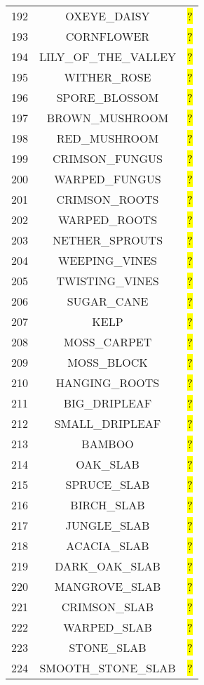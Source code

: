 \documentclass[11pt]{article}
\newcommand\myworries[1]{\sethlcolor{red}\hl{#1}}
\begin{document}
\begin{longtable}{ |c|c|c| }
	192 & OXEYE\_DAISY & \myworries{?} \\
	193 & CORNFLOWER & \myworries{?} \\
	194 & LILY\_OF\_THE\_VALLEY & \myworries{?} \\
	195 & WITHER\_ROSE & \myworries{?} \\
	196 & SPORE\_BLOSSOM & \myworries{?} \\
	197 & BROWN\_MUSHROOM & \myworries{?} \\
	198 & RED\_MUSHROOM & \myworries{?} \\
	199 & CRIMSON\_FUNGUS & \myworries{?} \\
	200 & WARPED\_FUNGUS & \myworries{?} \\
	201 & CRIMSON\_ROOTS & \myworries{?} \\
	202 & WARPED\_ROOTS & \myworries{?} \\
	203 & NETHER\_SPROUTS & \myworries{?} \\
	204 & WEEPING\_VINES & \myworries{?} \\
	205 & TWISTING\_VINES & \myworries{?} \\
	206 & SUGAR\_CANE & \myworries{?} \\
	207 & KELP & \myworries{?} \\
	208 & MOSS\_CARPET & \myworries{?} \\
	209 & MOSS\_BLOCK & \myworries{?} \\
	210 & HANGING\_ROOTS & \myworries{?} \\
	211 & BIG\_DRIPLEAF & \myworries{?} \\
	212 & SMALL\_DRIPLEAF & \myworries{?} \\
	213 & BAMBOO & \myworries{?} \\
	214 & OAK\_SLAB & \myworries{?} \\
	215 & SPRUCE\_SLAB & \myworries{?} \\
	216 & BIRCH\_SLAB & \myworries{?} \\
	217 & JUNGLE\_SLAB & \myworries{?} \\
	218 & ACACIA\_SLAB & \myworries{?} \\
	219 & DARK\_OAK\_SLAB & \myworries{?} \\
	220 & MANGROVE\_SLAB & \myworries{?} \\
	221 & CRIMSON\_SLAB & \myworries{?} \\
	222 & WARPED\_SLAB & \myworries{?} \\
	223 & STONE\_SLAB & \myworries{?} \\
	224 & SMOOTH\_STONE\_SLAB & \myworries{?} \\

\end{longtable}
\end{document}
